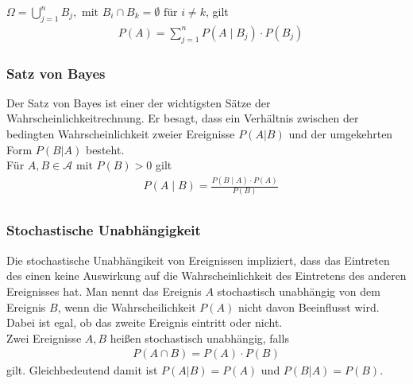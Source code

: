 \documentclass[a4paper]{article}
\begin{document}
$\Omega = \bigcup_{j=1}^{n} B_j, \text{ mit } B_i \cap B_k = \emptyset \text{ für } i \neq k $, gilt
\begin{align*}
& P(A ) = \sum_{j=1}^{n}  P(A \; | \;  B_j) \cdot P(B_j)
\end{align*}

\subsubsection{Satz von Bayes}
Der Satz von Bayes ist einer der wichtigsten Sätze der Wahrscheinlichkeitrechnung. Er besagt, dass ein Verhältnis zwischen der bedingten Wahrscheinlichkeit zweier Ereignisse $P(A | B)$ und der umgekehrten Form $P(B | A)$ besteht. \\

Für $A,B \in \mathcal{A}$ mit  $P(B) > 0$ gilt
\begin{align*}
& P(A \; | \;  B) = \frac{P(B \; | \; A) \cdot P(A)} {P(B)} \\
\end{align*}

\subsubsection{Stochastische Unabhängigkeit}
Die stochastische Unabhängikeit von Ereignissen impliziert, dass das Eintreten des einen keine Auswirkung auf die Wahrscheinlichkeit des Eintretens des anderen Ereignisses hat. Man nennt das Ereignis $A$ stochastisch unabhängig von dem Ereignis $B$, wenn die Wahrscheilichkeit $P(A)$ nicht davon Beeinflusst wird. Dabei ist egal, ob das zweite Ereignis eintritt oder nicht. \\

Zwei Ereignisse $A,B$ heißen stochastisch unabhängig, falls
\begin{align*}
P(A \cap B) = P(A) \cdot P(B)
\end{align*}
gilt.  Gleichbedeutend damit ist  $P(A | B) = P(A)$ und $P(B  | A) = P(B)$.
\newpage
\end{document}
